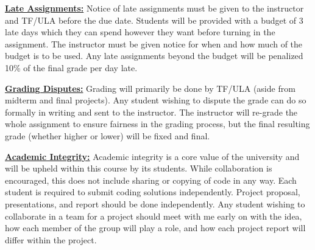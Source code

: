 \documentclass[11pt,letterpaper]{article}
\newcommand{\mysec}[1]{\medskip\noindent\underline{\textbf{#1}}}
\begin{document}
\mysec{Late Assignments:} Notice of late assignments must be given to the instructor and TF/ULA before the due date. Students will be provided with a budget of 3 late days which they can spend however they want before turning in the assignment. The instructor must be given notice for when and how much of the budget is to be used. Any late assignments beyond the budget will be penalized 10\% of the final grade per day late. 

\mysec{Grading Disputes:} Grading will primarily be done by TF/ULA (aside from midterm and final projects). Any student wishing to dispute the grade can do so formally in writing and sent to the instructor. The instructor will re-grade the whole assignment to ensure fairness in the grading process, but the final resulting grade (whether higher or lower) will be fixed and final.  


\mysec{Academic Integrity:} Academic integrity is a core value of the university and will be upheld within this course by its students. While collaboration is encouraged, this does not include sharing or copying of code in any way. Each student is required to submit coding solutions independently. Project proposal, presentations, and report should be done independently. Any student wishing to collaborate in a team for a project should meet with me early on with the idea, how each member of the group will play a role, and how each project report will differ within the project. 
\end{document}
